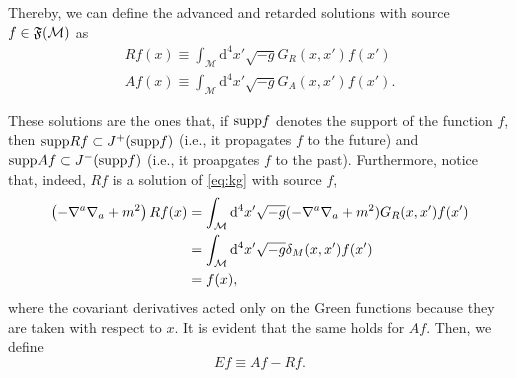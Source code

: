Thereby, we can define the advanced and retarded solutions with source \(f\in{\mathfrak{F}}({\mathcal{M}})\) as
\begin{subequations}
    \begin{align}
        Rf(x)\equiv\int_\mathcal{M}\mathrm{d}^4x'\sqrt{-g}G_R(x,x')f(x')\\
        Af(x)\equiv\int_\mathcal{M}\mathrm{d}^4x'\sqrt{-g}G_A(x,x')f(x').
    \end{align}
\end{subequations}

These solutions are the ones that, if \(\mathrm{supp}f\) denotes the support of the function \(f\), then \(\mathrm{supp}Rf\subset J^+(\mathrm{supp}f)\) (i.e., it propagates \(f\) to the future) and \(\mathrm{supp}Af\subset J^-(\mathrm{supp}f)\) (i.e., it proapgates \(f\) to the past). Furthermore, notice that, indeed, \(Rf\) is a solution of \cref{eq:kg} with source \(f\),
\begin{subequations}\label{eq:Rf-fonte-f}
    \begin{align}
        \left(-\nabla^a\nabla_a+m^2\right)Rf(x)&=\int_\mathcal{M}\mathrm{d}^4x'\sqrt{-g}(-\nabla^a\nabla_a+m^2)G_R(x,x')f(x')\\
        &=\int_{\mathcal{M}}\mathrm{d}^4x'\sqrt{-g}\delta_M(x,x')f(x')\\
        &=f(x),
    \end{align}
\end{subequations}
where the covariant derivatives acted only on the Green functions because they are taken with respect to \(x\). It is evident that the same holds for \(Af\). Then, we define
\begin{equation}
    Ef\equiv Af-Rf.
\end{equation}

